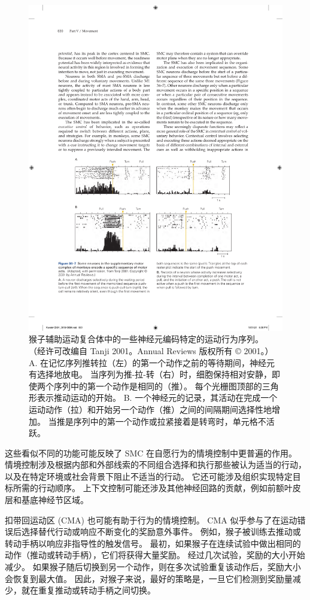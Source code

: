 \begin{figure}[htbp]
	\centering
	\includegraphics[width=0.8\linewidth]{chap34/fig_34_7}
	\caption{猴子辅助运动复合体中的一些神经元编码特定的运动行为序列。 （经许可改编自 Tanji 2001。Annual Reviews 版权所有 © 2001。） A. 在记忆序列推转拉（左）的第一个动作之前的等待期间，神经元有选择地放电。 当序列为推-拉-转（右）时，细胞保持相对安静，即使两个序列中的第一个动作是相同的（推）。 每个光栅图顶部的三角形表示推动运动的开始。 B. 一个神经元的记录，其活动在完成一个运动动作（拉）和开始另一个动作（推）之间的间隔期间选择性地增加。 当推是序列中的第一个动作或拉紧接着是转弯时，单元格不活跃。}
	\label{fig:34_7}
\end{figure}


这些看似不同的功能可能反映了 SMC 在自愿行为的情境控制中更普遍的作用。
情境控制涉及根据内部和外部线索的不同组合选择和执行那些被认为适当的行动，以及在特定环境或社会背景下阻止不适当的行动。
它还可能涉及组织实现特定目标所需的行动顺序。
上下文控制可能还涉及其他神经回路的贡献，例如前额叶皮层和基底神经节区域。


扣带回运动区 (CMA) 也可能有助于行为的情境控制。 CMA 似乎参与了在运动错误后选择替代行动或响应不断变化的奖励意外事件。
例如，猴子被训练去推动或转动手柄以响应非指导性的触发信号。
最初，如果猴子在连续试验中做出相同的动作（推动或转动手柄），它们将获得大量奖励。
经过几次试验，奖励的大小开始减少。
如果猴子随后切换到另一个动作，则在多次试验重复该动作后，奖励大小会恢复到最大值。
因此，对猴子来说，最好的策略是，一旦它们检测到奖励量减少，就在重复推动或转动手柄之间切换。


